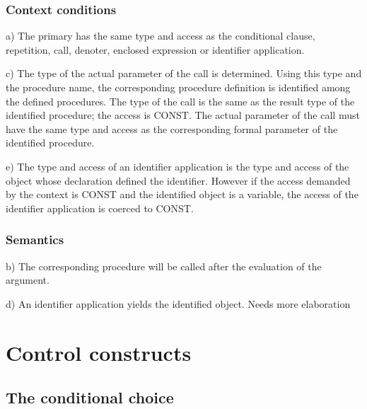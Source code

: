 \documentclass [a4paper,12pt,fleqn]{article}
\begin{document}
\subsubsection*{Context conditions}
\begin{list}{-}{}
\item [a)]
The primary has the same type and access as the conditional clause,
repetition, call, denoter, enclosed expression or identifier application.
\item [c)]
The type of the actual parameter of the call is determined.
Using this type and the procedure name, the corresponding
procedure definition is identified among the defined procedures.
The type of the call is the same as the result type of
the identified procedure; the access is CONST. The actual parameter
of the call must have the same type and access as the corresponding
formal parameter of the identified procedure. 
\item [e)]
The type and access of an identifier application is the type
and access of the object whose declaration defined the identifier.
However if the access demanded by the context is CONST and the
identified object is a variable, the access of the identifier
application is coerced to CONST.
\end{list}
\subsubsection*{Semantics}
\begin{list}{-}{}
\item[b)]
The corresponding procedure will be called after the evaluation of
the argument. 
\item[d)]
An identifier application yields the identified object. Needs more
elaboration
\end{list}
\section {Control constructs}
\subsection {The conditional choice}
\end{document}
